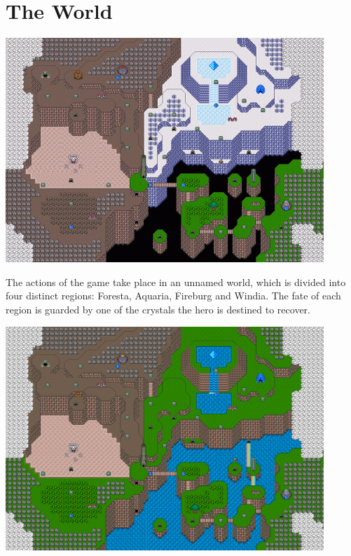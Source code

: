 \chapter{The World}

\begin{center}
	\includegraphics[width=0.9\textwidth]{./resources/map/world}
\end{center}

The actions of the game take place in an unnamed world, which is divided into four distinct regions: Foresta, Aquaria, Fireburg and Windia. The fate of each region is guarded by one of the crystals the hero is destined to recover.

\begin{center}
	\includegraphics[width=0.9\textwidth]{./resources/map/world_final}
\end{center}


\newpage

\newpage

\newpage

\newpage


\newpage


